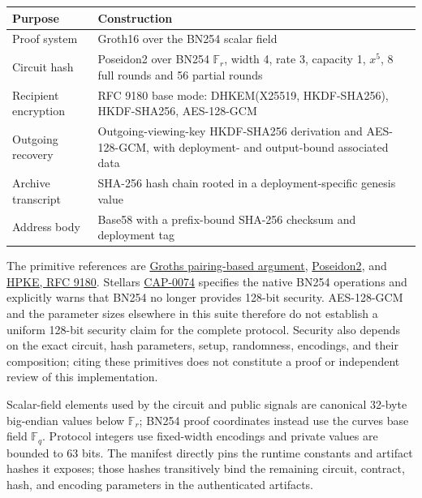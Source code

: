 \documentclass[11pt,letterpaper]{article}
\begin{document}
{\def\LTcaptype{none} %
\begin{longtable}[]{@{}
  >{\raggedright\arraybackslash}p{}
  >{\raggedright\arraybackslash}p{}@{}}
\toprule\noalign{}
\begin{minipage}[b]{\linewidth}\raggedright
Purpose
\end{minipage} & \begin{minipage}[b]{\linewidth}\raggedright
Construction
\end{minipage} \\
\midrule\noalign{}
\endhead
\bottomrule\noalign{}
\endlastfoot
Proof system & Groth16 over the BN254 scalar field \\
Circuit hash & Poseidon2 over BN254 \(\mathbb{F}_r\), width 4, rate 3,
capacity 1, \(x^5\), 8 full rounds and 56 partial rounds \\
Recipient encryption & RFC 9180 base mode: DHKEM(X25519, HKDF-SHA256),
HKDF-SHA256, AES-128-GCM \\
Outgoing recovery & Outgoing-viewing-key HKDF-SHA256 derivation and
AES-128-GCM, with deployment- and output-bound associated data \\
Archive transcript & SHA-256 hash chain rooted in a deployment-specific
genesis value \\
Address body & Base58 with a prefix-bound SHA-256 checksum and
deployment tag \\
\end{longtable}
}

The primitive references are
\href{https://eprint.iacr.org/2016/260}{Groth\textquotesingle s
pairing-based argument},
\href{https://eprint.iacr.org/2023/323}{Poseidon2}, and
\href{https://www.rfc-editor.org/rfc/rfc9180}{HPKE, RFC 9180}.
Stellar\textquotesingle s
\href{https://github.com/stellar/stellar-protocol/blob/master/core/cap-0074.md}{CAP-0074}
specifies the native BN254 operations and explicitly warns that BN254 no
longer provides 128-bit security. AES-128-GCM and the parameter sizes
elsewhere in this suite therefore do not establish a uniform 128-bit
security claim for the complete protocol. Security also depends on the
exact circuit, hash parameters, setup, randomness, encodings, and their
composition; citing these primitives does not constitute a proof or
independent review of this implementation.

Scalar-field elements used by the circuit and public signals are
canonical 32-byte big-endian values below \(\mathbb{F}_r\); BN254 proof
coordinates instead use the curve\textquotesingle s base field
\(\mathbb{F}_q\). Protocol integers use fixed-width encodings and
private values are bounded to 63 bits. The manifest directly pins the
runtime constants and artifact hashes it exposes; those hashes
transitively bind the remaining circuit, contract, hash, and encoding
parameters in the authenticated artifacts.
\end{document}
